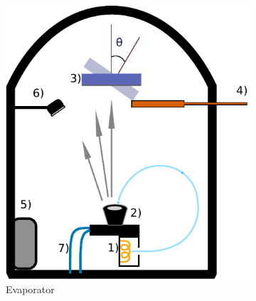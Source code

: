 \documentclass[final]{jyflluk}
\begin{document}
\begin{figure}[h]
    \centering
    \begin{subfigure}{0.56\textwidth}
        \centering
        \includegraphics[width=\linewidth]{images/evaporatorr.pdf} 
        \caption{Evaporator} \label{fig:evaporator}
    \end{subfigure}
    \hfill  
    \begin{subfigure}{0.35\textwidth}
        \centering
        \vspace{1.6cm}

\end{subfigure}
\end{figure}
\end{document}
